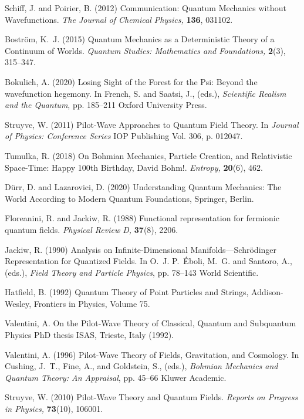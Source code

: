 \documentclass[onecolumn,secnumarabic,amsmath,amssymb,balancelastpage,nofootinbib]{article}
\begin{document}
\begin{thebibliography}{100}
Schiff, J. and Poirier, B. (2012)
Communication: Quantum Mechanics without Wavefunctions.
{\em The Journal of Chemical Physics,} {\bf 136}, 031102.

Bostr{\"o}m, K.~J. (2015)
Quantum Mechanics as a Deterministic Theory of a Continuum of Worlds.
{\em Quantum Studies: Mathematics and Foundations,} {\bf 2}(3), 315--347.

Bokulich, A. (2020)
Losing Sight of the Forest for the Psi: Beyond the wavefunction hegemony.
In French, S. and Saatsi, J., (eds.), \emph{Scientific Realism and the
  Quantum},  pp. 185--211 Oxford University Press.

Struyve, W. (2011)
Pilot-Wave Approaches to Quantum Field Theory.
In \emph{Journal of Physics: Conference Series} IOP Publishing
Vol. 306,  p. 012047.

Tumulka, R. (2018)
On Bohmian Mechanics, Particle Creation, and Relativistic Space-Time: Happy
  100th Birthday, David Bohm!.
{\em Entropy,} {\bf 20}(6), 462.

D\"{u}rr, D. and Lazarovici, D. (2020)
Understanding Quantum Mechanics: The World According to Modern Quantum
  Foundations,
Springer, Berlin.

Floreanini, R. and Jackiw, R. (1988)
Functional representation for fermionic quantum fields.
{\em Physical Review D,} {\bf 37}(8), 2206.

Jackiw, R. (1990)
Analysis on Infinite-Dimensional Manifolds---Schr\"{o}dinger Representation for
  Quantized Fields.
In O.~J. P.~\'{E}boli, M.~G. and Santoro, A., (eds.), \emph{Field Theory and
  Particle Physics},  pp. 78--143 World Scientific.

Hatfield, B. (1992)
Quantum Theory of Point Particles and Strings,
Addison-Wesley,
Frontiers in Physics, Volume 75.

Valentini, A.
On the Pilot-Wave Theory of Classical, Quantum and Subquantum Physics
PhD thesis ISAS, Trieste, Italy (1992).

Valentini, A. (1996)
Pilot-Wave Theory of Fields, Gravitation, and Cosmology.
In Cushing, J.~T., Fine, A., and Goldstein, S., (eds.), \emph{Bohmian Mechanics
  and Quantum Theory: An Appraisal},  pp. 45--66 Kluwer Academic.

Struyve, W. (2010)
Pilot-Wave Theory and Quantum Fields.
{\em Reports on Progress in Physics,} {\bf 73}(10), 106001.


\end{thebibliography}
\end{document}
